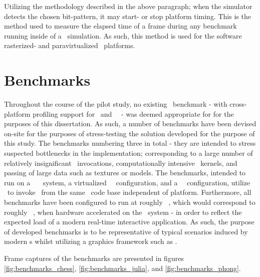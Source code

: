\noindent
Utilizing the methodology described in the above paragraph; when the simulator detects the chosen bit-pattern, it may start- or stop platform timing.
This is the method used to measure the elapsed time of a frame during any benchmark running inside of a \dvttermsimics\ simulation.
As such, this method is used for the software rasterized- and paravirtualized \dvttermsimics\ platforms. 




\section{Benchmarks}
\label{sec:experimentalmethodology_benchmarks}
Throughout the course of the pilot study, no existing \dvttermopenglestwopointo\ benchmark - with cross-platform profiling support for \dvttermandroid\ and \dvttermxeleven\ \dvttermlinux\ - was deemed appropriate for for the purposes of this dissertation.
As such, a number of benchmarks have been devised on-site for the purposes of stress-testing the solution developed for the purpose of this study.
The benchmarks numbering three in total - they are intended to stress suspected bottlenecks in the implementation; corresponding to a large number of relatively insignificant \dvttermopengl\ invocations, computationally intensive \dvttermgpu\ kernels, and passing of large data such as textures or models.
The benchmarks, intended to run on a \dvttermhost\ \dvttermfedora\ \dvttermlinux\ system, a virtualized \dvttermsimics\ \dvttermfedora\ configuration, and a \dvttermqemu\ \dvttermandroid\ configuration, utilize \dvttermjni\ to invoke \dvttermopengles\ from the same \dvttermc\ code base independent of platform.
Furthermore, all benchmarks have been configured to run at roughly ~\milli\second , which would correspond to roughly ~\dvttermfps , when hardware accelerated on the \dvttermhost\ system - in order to reflect the expected load of a modern real-time interactive application.
As such, the purpose of developed benchmarks is to be representative of typical scenarios induced by modern \dvttermgui s whilst utilizing a graphics framework such as \dvttermopengl .

Frame captures of the benchmarks are presented in figures \ref{fig:benchmarks_chess}, \ref{fig:benchmarks_julia}, and \ref{fig:benchmarks_phong}.

